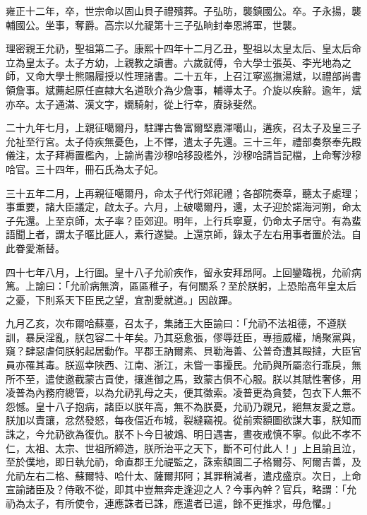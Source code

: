 \begin{pinyinscope}
雍正十二年，卒，世宗命以固山貝子禮殯葬。子弘昉，襲鎮國公。卒。子永揚，襲輔國公。坐事，奪爵。高宗以允禔第十三子弘晌封奉恩將軍，世襲。

理密親王允礽，聖祖第二子。康熙十四年十二月乙丑，聖祖以太皇太后、皇太后命立為皇太子。太子方幼，上親教之讀書。六歲就傅，令大學士張英、李光地為之師，又命大學士熊賜履授以性理諸書。二十五年，上召江寧巡撫湯斌，以禮部尚書領詹事。斌薦起原任直隸大名道耿介為少詹事，輔導太子。介旋以疾辭。逾年，斌亦卒。太子通滿、漢文字，嫺騎射，從上行幸，賡詠斐然。

二十九年七月，上親征噶爾丹，駐蹕古魯富爾堅嘉渾噶山，遘疾，召太子及皇三子允祉至行宮。太子侍疾無憂色，上不懌，遣太子先還。三十三年，禮部奏祭奉先殿儀注，太子拜褥置檻內，上諭尚書沙穆哈移設檻外，沙穆哈請旨記檔，上命奪沙穆哈官。三十四年，冊石氏為太子妃。

三十五年二月，上再親征噶爾丹，命太子代行郊祀禮；各部院奏章，聽太子處理；事重要，諸大臣議定，啟太子。六月，上破噶爾丹，還，太子迎於諾海河朔，命太子先還。上至京師，太子率？臣郊迎。明年，上行兵寧夏，仍命太子居守。有為蜚語聞上者，謂太子暱比匪人，素行遂變。上還京師，錄太子左右用事者置於法。自此眷愛漸替。

四十七年八月，上行圍。皇十八子允祄疾作，留永安拜昂阿。上回鑾臨視，允祄病篤。上諭曰：「允祄病無濟，區區稚子，有何關系？至於朕躬，上恐貽高年皇太后之憂，下則系天下臣民之望，宜割愛就道。」因啟蹕。

九月乙亥，次布爾哈蘇臺，召太子，集諸王大臣諭曰：「允礽不法祖德，不遵朕訓，暴戾淫亂，朕包容二十年矣。乃其惡愈張，僇辱廷臣，專擅威權，鳩聚黨與，窺？肆惡虐伺朕躬起居動作。平郡王訥爾素、貝勒海善、公普奇遭其毆撻，大臣官員亦罹其毒。朕巡幸陜西、江南、浙江，未嘗一事擾民。允礽與所屬恣行乖戾，無所不至，遣使邀截蒙古貢使，攘進御之馬，致蒙古俱不心服。朕以其賦性奢侈，用凌普為內務府總管，以為允礽乳母之夫，便其徵索。凌普更為貪婪，包衣下人無不怨憾。皇十八子抱病，諸臣以朕年高，無不為朕憂，允礽乃親兄，絕無友愛之意。朕加以責讓，忿然發怒，每夜偪近布城，裂縫竊視。從前索額圖欲謀大事，朕知而誅之，今允礽欲為復仇。朕不卜今日被鴆、明日遇害，晝夜戒慎不寧。似此不孝不仁，太祖、太宗、世祖所締造，朕所治平之天下，斷不可付此人！」上且諭且泣，至於僕地，即日執允礽，命直郡王允禔監之，誅索額圖二子格爾芬、阿爾吉善，及允礽左右二格、蘇爾特、哈什太、薩爾邦阿；其罪稍減者，遣戍盛京。次日，上命宣諭諸臣及？侍敢不從，即其中豈無奔走逢迎之人？今事內幹？官兵，略謂：「允礽為太子，有所使令，連應誅者已誅，應遣者已遣，餘不更推求，毋危懼。」


\end{pinyinscope}
